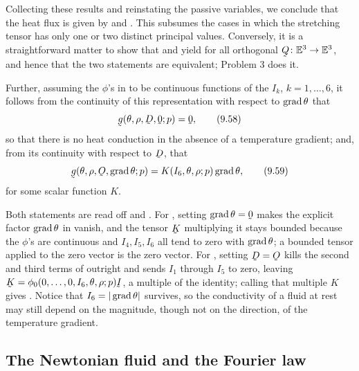 Collecting these results and reinstating the passive variables, we
conclude that the heat flux is given by  and . This
subsumes the cases in which the stretching tensor has only one or two
distinct principal values. Conversely, it is a straightforward matter to
show that  and  yield  for all orthogonal
$\bQ\colon\Et\to\Et$, and hence that the two statements are equivalent;
Problem 3 does it.

Further, assuming the $\phi$'s in  to be continuous functions
of the $I_{k}$, $k=1,\ldots,6$, it follows from the continuity of this
representation with respect to $\operatorname{grad}\theta$ that
\begin{equation}
   \bg(\theta,\rho,\bD,\bze;p)=\bze,
   \tag{9.58}\label{eq:9.58}
\end{equation}
so that there is no heat conduction in the absence of a temperature
gradient; and, from its continuity with respect to $\bD$, that
\begin{equation}
   \bg(\theta,\rho,\Ob,\grad\theta;p)=K(I_{6},\theta,\rho;p)\grad\theta,
   \tag{9.59}\label{eq:9.59}
\end{equation}
for some scalar function $K$.

Both statements are read off  and . For ,
setting $\grad\theta=\bze$ makes the explicit factor $\operatorname{grad}\theta$ in
 vanish, and the tensor $\bK$ multiplying it stays bounded
because the $\phi$'s are continuous and $I_{4},I_{5},I_{6}$ all tend to
zero with $\operatorname{grad}\theta$; a bounded tensor applied to the zero vector is
the zero vector. For , setting $\bD=\Ob$ kills the second and
third terms of  outright and sends $I_{1}$ through $I_{5}$ to
zero, leaving $\bK=\phi_{0}(0,\ldots,0,I_{6},\theta,\rho;p)\I$, a
multiple of the identity; calling that multiple $K$ gives .
Notice that $I_{6}=|\operatorname{grad}\theta|$ survives, so the conductivity of a
fluid at rest may still depend on the magnitude, though not on the
direction, of the temperature gradient.

\subsection*{The Newtonian fluid and the Fourier law}

